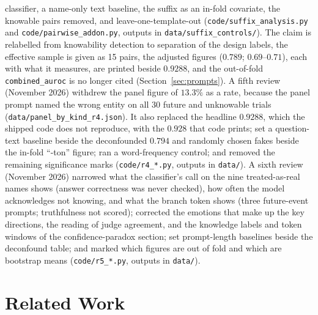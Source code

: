 \documentclass[11pt,a4paper]{article}
\begin{document}
classifier, a name-only text baseline, the suffix as an in-fold
covariate, the knowable pairs removed, and leave-one-template-out
(\texttt{code/suffix\_analysis.py} and \texttt{code/pairwise\_addon.py},
outputs in \texttt{data/suffix\_controls/}). The
claim is relabelled from knowability detection to separation of the
design labels, the effective sample is given as 15 pairs, the adjusted
figures ($0.789$; $0.69$--$0.71$), each with what it measures, are
printed beside $0.9288$, and the out-of-fold \texttt{combined\_auroc} is
no longer cited (Section~\ref{sec:prompts}). A fifth review (November 2026) withdrew the panel figure of $13.3\%$ as a rate, because the panel prompt named the wrong entity on all 30 future and unknowable trials (\texttt{data/panel\_by\_kind\_r4.json}). It also replaced the headline $0.9288$, which the shipped code does not reproduce, with the $0.928$ that code prints; set a question-text baseline beside the deconfounded $0.794$ and randomly chosen fakes beside the in-fold ``-ton'' figure; ran a word-frequency control; and removed the remaining significance marks (\texttt{code/r4\_*.py}, outputs in \texttt{data/}). A sixth review (November 2026) narrowed what the classifier's call on the nine treated-as-real names shows (answer correctness was never checked), how often the model acknowledges not knowing, and what the branch token shows (three future-event prompts; truthfulness not scored); corrected the emotions that make up the key directions, the reading of judge agreement, and the knowledge labels and token windows of the confidence-paradox section; set prompt-length baselines beside the deconfound table; and marked which figures are out of fold and which are bootstrap means (\texttt{code/r5\_*.py}, outputs in \texttt{data/}).

\section{Related Work}
\end{document}
